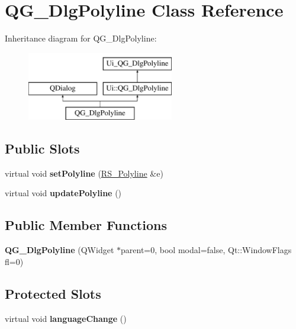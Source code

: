 \hypertarget{classQG__DlgPolyline}{\section{Q\-G\-\_\-\-Dlg\-Polyline Class Reference}
\label{classQG__DlgPolyline}
}
Inheritance diagram for Q\-G\-\_\-\-Dlg\-Polyline\-:\begin{figure}[H]
\begin{center}
\leavevmode
\includegraphics[height=3.000000cm]{classQG__DlgPolyline}
\end{center}
\end{figure}
\subsection*{Public Slots}
\begin{DoxyCompactItemize}
\item 
\hypertarget{classQG__DlgPolyline_ae2e02483c7157fedad8ff25c3375d24f}{virtual void {\bfseries set\-Polyline} (\hyperlink{classRS__Polyline}{R\-S\-\_\-\-Polyline} \&e)}\label{classQG__DlgPolyline_ae2e02483c7157fedad8ff25c3375d24f}

\item 
\hypertarget{classQG__DlgPolyline_a7e260ad6e316b27b109488498c0a12f0}{virtual void {\bfseries update\-Polyline} ()}\label{classQG__DlgPolyline_a7e260ad6e316b27b109488498c0a12f0}

\end{DoxyCompactItemize}
\subsection*{Public Member Functions}
\begin{DoxyCompactItemize}
\item 
\hypertarget{classQG__DlgPolyline_ac5b54439633181e8b1882ad5a1158685}{{\bfseries Q\-G\-\_\-\-Dlg\-Polyline} (Q\-Widget $\ast$parent=0, bool modal=false, Qt\-::\-Window\-Flags fl=0)}\label{classQG__DlgPolyline_ac5b54439633181e8b1882ad5a1158685}

\end{DoxyCompactItemize}
\subsection*{Protected Slots}
\begin{DoxyCompactItemize}
\item 
\hypertarget{classQG__DlgPolyline_ac8cca7f6a6647776e477b923ed897ec8}{virtual void {\bfseries language\-Change} ()}\label{classQG__DlgPolyline_ac8cca7f6a6647776e477b923ed897ec8}

\end{DoxyCompactItemize}
